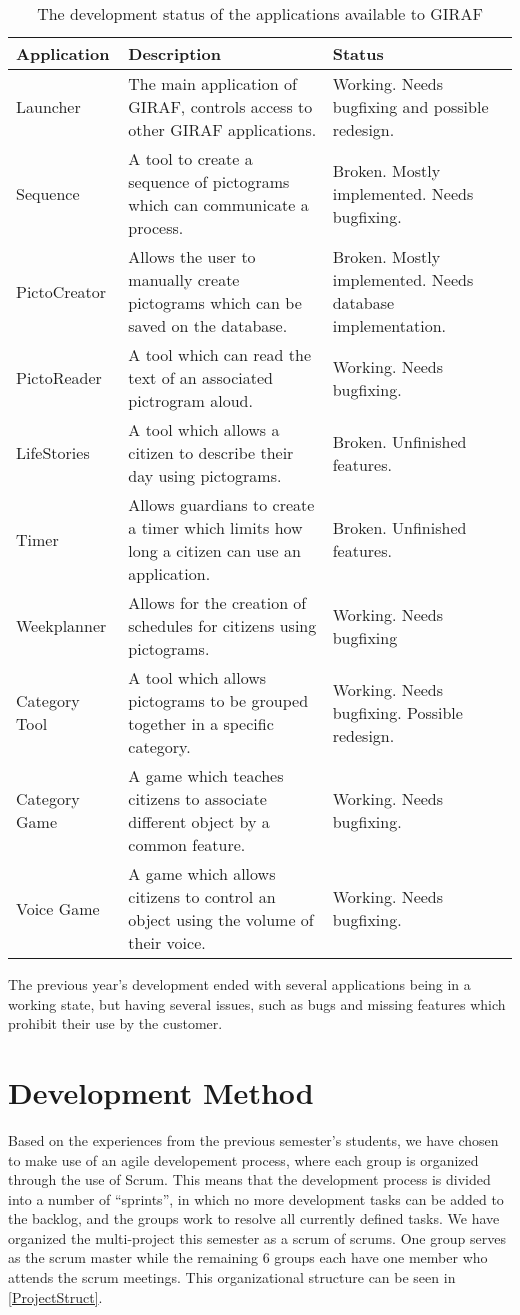 \begin{table}[H]
\centering
\begin{tabular}{|p{2.7cm}|p{6cm}|p{5cm}|}
\hline
Application			& Description & Status \\\hline
Launcher  			& The main application of GIRAF, controls access to other GIRAF
applications. & Working. Needs bugfixing and possible redesign. \\\hline
Sequence & A tool to create a sequence of pictograms which can communicate a
process. & Broken. Mostly implemented. Needs bugfixing.\\\hline 
PictoCreator  	   	& Allows the user to
manually create pictograms which can be saved on the database. & Broken. Mostly
implemented. Needs database implementation.\\\hline 
PictoReader	   		& A tool
which can read the text of an associated pictrogram aloud. & Working.
Needs bugfixing.\\\hline 
LifeStories	   		& A tool which allows a citizen to
describe their day using pictograms. & Broken. Unfinished features. \\\hline 
Timer     	   		& Allows guardians to create a timer which
limits how long a citizen can use an application. & Broken. Unfinished
features.\\\hline 
Weekplanner 		& Allows for the creation of schedules for citizens
using pictograms. & Working. Needs bugfixing\\\hline 
Category Tool		& A tool which allows pictograms to be grouped together
in a specific category. & Working. Needs bugfixing. Possible redesign.\\\hline 
Category Game   	& A game which teaches citizens to associate
different object by a common feature. & Working. Needs bugfixing.\\\hline 
Voice Game  		& A game which allows citizens to control an object
using the volume of their voice. & Working. Needs bugfixing.\\\hline
\end{tabular} 
\caption{The development status of the applications available to GIRAF}
\label{GApps}
\end{table}

The previous year's development ended with several applications being in a
working state, but having several issues, such as bugs and missing features
which prohibit their use by the customer.

\section{Development Method}
Based on the experiences from the previous semester's students, we have chosen
to make use of an agile developement process, where each group is organized through
the use of Scrum. This means that the development process is divided into a
number of ``sprints'', in which no more development tasks can be added to the
backlog, and the groups work to resolve all currently defined tasks. We have
organized the multi-project this semester as a scrum of scrums. One group serves
as the scrum master while the remaining 6 groups each have one member who
attends the scrum meetings. This organizational structure can be seen in
\autoref{ProjectStruct}.

